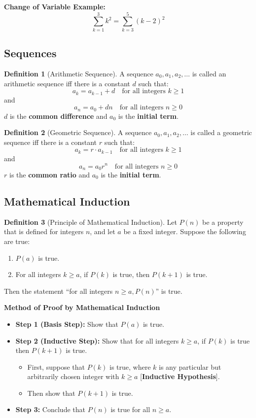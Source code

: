 \documentclass{article}
\theoremstyle{plain}
\theoremstyle{definition}
\newtheorem*{definition}{Definition}
\theoremstyle{remark}
\begin{document}
\textbf{Change of Variable Example:}
\[ \sum_{k=1}^{3} k^2 = \sum_{k=3}^{5} (k-2)^2 \]

\subsection{Sequences}

\begin{definition}[Arithmetic Sequence]
    A sequence $a_0, a_1, a_2, \dots$ is called an arithmetic sequence iff there is a constant $d$ such that:
    \[ a_k = a_{k-1} + d \quad \text{for all integers } k \geq 1 \]
    and
    \[ a_n = a_0 + dn \quad \text{for all integers } n \geq 0 \]
    $d$ is the \textbf{common difference} and $a_0$ is the \textbf{initial term}.
\end{definition}

\begin{definition}[Geometric Sequence]
    A sequence $a_0, a_1, a_2, \dots$ is called a geometric sequence iff there is a constant $r$ such that:
    \[ a_k = r \cdot a_{k-1} \quad \text{for all integers } k \geq 1 \]
    and
    \[ a_n = a_0 r^n \quad \text{for all integers } n \geq 0 \]
    $r$ is the \textbf{common ratio} and $a_0$ is the \textbf{initial term}.
\end{definition}

\subsection{Mathematical Induction}

\begin{definition}[Principle of Mathematical Induction]
    Let $P(n)$ be a property that is defined for integers $n$, and let $a$ be a fixed integer.
    Suppose the following are true:
    \begin{enumerate}[label=\arabic*.]
        \item $P(a)$ is true.
        \item For all integers $k \geq a$, if $P(k)$ is true, then $P(k+1)$ is true.
    \end{enumerate}
    Then the statement ``for all integers $n \geq a, P(n)$'' is true.
\end{definition}

\textbf{Method of Proof by Mathematical Induction}
\begin{itemize}
    \item \textbf{Step 1 (Basis Step):} Show that $P(a)$ is true.
    \item \textbf{Step 2 (Inductive Step):} Show that for all integers $k \geq a$, if $P(k)$ is true then $P(k+1)$ is true.
    \begin{itemize}
        \item First, suppose that $P(k)$ is true, where $k$ is any particular but arbitrarily chosen integer with $k \geq a$ [\textbf{Inductive Hypothesis}].
        \item Then show that $P(k+1)$ is true.
    \end{itemize}
    \item \textbf{Step 3:} Conclude that $P(n)$ is true for all $n \geq a$.
\end{itemize}
\end{document}
